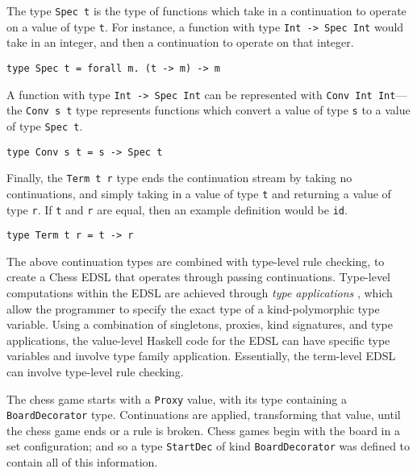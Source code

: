 \documentclass[12pt, a4paper, bibliography=totocnumbered]{scrartcl}
\begin{document}
The type \lstinline[basicstyle=\ttfamily]{Spec t} is the type of functions which take in a continuation to operate on a value of type \lstinline[basicstyle=\ttfamily]{t}. For instance, a function with type \lstinline[basicstyle=\ttfamily]{Int -> Spec Int} would take in an integer, and then a continuation to operate on that integer.

\begin{lstlisting}
type Spec t = forall m. (t -> m) -> m
\end{lstlisting}

A function with type \lstinline[basicstyle=\ttfamily]{Int -> Spec Int} can be represented with \lstinline[basicstyle=\ttfamily]{Conv Int Int}---the \lstinline[basicstyle=\ttfamily]{Conv s t} type represents functions which convert a value of type \lstinline[basicstyle=\ttfamily]{s} to a value of type \lstinline[basicstyle=\ttfamily]{Spec t}.

\begin{lstlisting}
type Conv s t = s -> Spec t
\end{lstlisting}

Finally, the \lstinline[basicstyle=\ttfamily]{Term t r} type ends the continuation stream by taking no continuations, and simply taking in a value of type \lstinline[basicstyle=\ttfamily]{t} and returning a value of type \lstinline[basicstyle=\ttfamily]{r}. If \lstinline[basicstyle=\ttfamily]{t} and \lstinline[basicstyle=\ttfamily]{r} are equal, then an example definition would be \lstinline[basicstyle=\ttfamily]{id}.

\begin{lstlisting}
type Term t r = t -> r
\end{lstlisting}

The above continuation types are combined with type-level rule checking, to create a Chess EDSL that operates through passing continuations. Type-level computations within the EDSL are achieved through \emph{type applications} \cite{typeapplication}, which allow the programmer to specify the exact type of a kind-polymorphic type variable. Using a combination of singletons, proxies, kind signatures, and type applications, the value-level Haskell code for the EDSL can have specific type variables and involve type family application. Essentially, the term-level EDSL can involve type-level rule checking.

The chess game starts with a \lstinline[basicstyle=\ttfamily]{Proxy} value, with its type containing a \lstinline[basicstyle=\ttfamily]{BoardDecorator} type. Continuations are applied, transforming that value, until the chess game ends or a rule is broken. Chess games begin with the board in a set configuration; and so a type \lstinline[basicstyle=\ttfamily]{StartDec} of kind \lstinline[basicstyle=\ttfamily]{BoardDecorator} was defined to contain all of this information.
\end{document}
